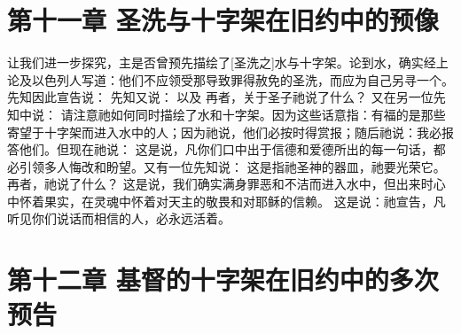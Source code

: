 
\section{第十一章 圣洗与十字架在旧约中的预像}

让我们进一步探究，主是否曾预先描绘了[圣洗之]水与十字架。论到水，确实经上论及以色列人写道：他们不应领受那导致罪得赦免的圣洗，而应为自己另寻一个。先知因此宣告说：  先知又说：  以及 再者，关于圣子祂说了什么？  又在另一位先知中说： 请注意祂如何同时描绘了水和十字架。因为这些话意指：有福的是那些寄望于十字架而进入水中的人；因为祂说，他们必按时得赏报；随后祂说：我必报答他们。但现在祂说： 这是说，凡你们口中出于信德和爱德所出的每一句话，都必引领多人悔改和盼望。又有一位先知说：  这是指祂圣神的器皿，祂要光荣它。再者，祂说了什么？  这是说，我们确实满身罪恶和不洁而进入水中，但出来时心中怀着果实，在灵魂中怀着对天主的敬畏和对耶稣的信赖。 这是说：祂宣告，凡听见你们说话而相信的人，必永远活着。\par


\section{第十二章 基督的十字架在旧约中的多次预告}

